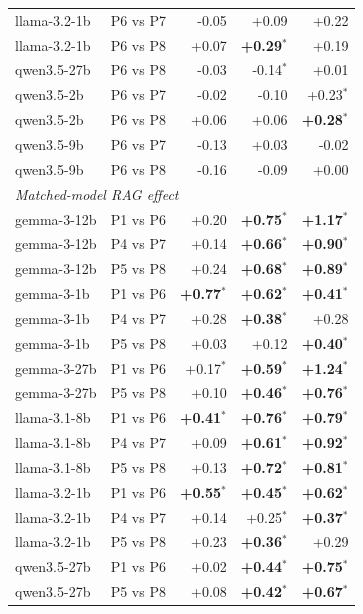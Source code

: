 \begin{table}[p]
\begin{tabular}{llrrr}
llama-3.2-1b & P6 vs P7 & -0.05 & +0.09 & +0.22 \\
llama-3.2-1b & P6 vs P8 & +0.07 & \textbf{+0.29$^{*}$} & +0.19 \\
qwen3.5-27b & P6 vs P8 & -0.03 & -0.14$^{*}$ & +0.01 \\
qwen3.5-2b & P6 vs P7 & -0.02 & -0.10 & +0.23$^{*}$ \\
qwen3.5-2b & P6 vs P8 & +0.06 & +0.06 & \textbf{+0.28$^{*}$} \\
qwen3.5-9b & P6 vs P7 & -0.13 & +0.03 & -0.02 \\
qwen3.5-9b & P6 vs P8 & -0.16 & -0.09 & +0.00 \\
\midrule \multicolumn{5}{l}{\textit{Matched-model RAG effect}} \\ \midrule
gemma-3-12b & P1 vs P6 & +0.20 & \textbf{+0.75$^{*}$} & \textbf{+1.17$^{*}$} \\
gemma-3-12b & P4 vs P7 & +0.14 & \textbf{+0.66$^{*}$} & \textbf{+0.90$^{*}$} \\
gemma-3-12b & P5 vs P8 & +0.24 & \textbf{+0.68$^{*}$} & \textbf{+0.89$^{*}$} \\
gemma-3-1b & P1 vs P6 & \textbf{+0.77$^{*}$} & \textbf{+0.62$^{*}$} & \textbf{+0.41$^{*}$} \\
gemma-3-1b & P4 vs P7 & +0.28 & \textbf{+0.38$^{*}$} & +0.28 \\
gemma-3-1b & P5 vs P8 & +0.03 & +0.12 & \textbf{+0.40$^{*}$} \\
gemma-3-27b & P1 vs P6 & +0.17$^{*}$ & \textbf{+0.59$^{*}$} & \textbf{+1.24$^{*}$} \\
gemma-3-27b & P5 vs P8 & +0.10 & \textbf{+0.46$^{*}$} & \textbf{+0.76$^{*}$} \\
llama-3.1-8b & P1 vs P6 & \textbf{+0.41$^{*}$} & \textbf{+0.76$^{*}$} & \textbf{+0.79$^{*}$} \\
llama-3.1-8b & P4 vs P7 & +0.09 & \textbf{+0.61$^{*}$} & \textbf{+0.92$^{*}$} \\
llama-3.1-8b & P5 vs P8 & +0.13 & \textbf{+0.72$^{*}$} & \textbf{+0.81$^{*}$} \\
llama-3.2-1b & P1 vs P6 & \textbf{+0.55$^{*}$} & \textbf{+0.45$^{*}$} & \textbf{+0.62$^{*}$} \\
llama-3.2-1b & P4 vs P7 & +0.14 & +0.25$^{*}$ & \textbf{+0.37$^{*}$} \\
llama-3.2-1b & P5 vs P8 & +0.23 & \textbf{+0.36$^{*}$} & +0.29 \\
qwen3.5-27b & P1 vs P6 & +0.02 & \textbf{+0.44$^{*}$} & \textbf{+0.75$^{*}$} \\
qwen3.5-27b & P5 vs P8 & +0.08 & \textbf{+0.42$^{*}$} & \textbf{+0.67$^{*}$} \\

\end{tabular}
\end{table}
